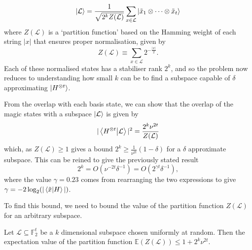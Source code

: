 \documentclass{standalone}
\begin{document}
\begin{equation}
  \label{eq:Hsubspaces}
  \ket{\mathcal{L}}=\frac{1}{\sqrt{2^{k}Z(\mathcal{L})}}\sum_{x\in\mathcal{L}}\ket{\tilde{x}_{1}\otimes\cdots\otimes\tilde{x}_{t}}
\end{equation}
where $Z(\mathcal{L})$ is a `partition function' based on the Hamming weight of each string $\vert x\vert$ that ensures proper normalisation, given by
\begin{equation}
  \label{eq:ZH}
  Z(\mathcal{L})\equiv\sum_{x\in\mathcal{L}}2^{-\frac{\vert x \vert}{2}}.
\end{equation}
Each of these normalised states has a stabiliser rank $2^{k}$, and so the problem now reduces to understanding how small $k$ can be to find a subspace capable of $\delta$ approximating $\ket{H^{\otimes t}}$.
\par
From the overlap with each basis state, we can show that the overlap of the magic states with a subspace $\ket{\mathcal{L}}$ is given by
\begin{equation}
    \label{eq:HLoverlap}
    \vert\braket{H^{\otimes t}}{\mathcal{L}}\vert^{2}=\frac{2^{k}\nu^{2t}}{Z(\mathcal{L})}
\end{equation}
which, as $Z(\mathcal{L})\geq 1$ gives a bound $2^{k}\geq \frac{1}{\nu^{2t}}(1-\delta)$ for a $\delta$ approximate subspace. This can be reined to give the previously stated result
\begin{equation}
2^{k}=O(\nu^{-2t}\delta^{-1})=O(2^{\gamma t}\delta^{-1}),
\end{equation} 
where the value $\gamma=0.23$ comes from rearranging the two expressions to give $\gamma=-2\log_{2}(\vert\braket{\tilde{x}}{H}\vert)$.
\par
To find this bound, we need to bound the value of the partition function $Z(\mathcal{L})$ for an arbitrary subspace.
\par
\begin{lem}\label{thm:expectation}
    Let $\mathcal{L}\subseteq\mathbb{F}_{2}^{t}$ be a $k$ dimensional subspace chosen uniformly at random. Then the expectation value of the partition function $\mathbb{E}(Z(\mathcal{L}))\leq 1+2^{k}\nu^{2t}$.
\end{lem}
\end{document}
